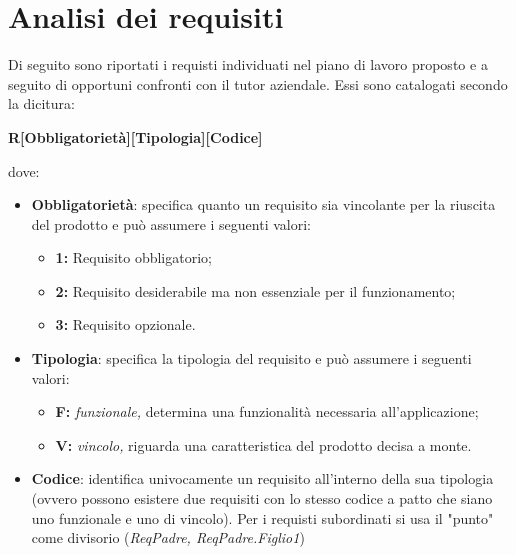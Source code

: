 \section{Analisi dei requisiti}
\label{sec:analisi_requisiti}
Di seguito sono riportati i requisti individuati nel piano di lavoro proposto e a seguito di opportuni confronti con il tutor aziendale. Essi sono catalogati secondo la dicitura:
\begin{center}
    \textbf{R[Obbligatorietà][Tipologia][Codice]}
\end{center}
dove:
\begin{itemize}
    \item \textbf{Obbligatorietà}: specifica quanto un requisito sia vincolante per la riuscita del prodotto e può assumere i seguenti valori:
    \begin{itemize}
        \item \textbf{1: } Requisito obbligatorio;
        \item \textbf{2: } Requisito desiderabile ma non essenziale per il funzionamento;
        \item \textbf{3: } Requisito opzionale.
    \end{itemize}
    \item \textbf{Tipologia}: specifica la tipologia del requisito e può assumere i seguenti valori:
    \begin{itemize}
        \item \textbf{F: }\textit{funzionale,} determina una funzionalità necessaria all'applicazione;
        \item \textbf{V: }\textit{vincolo,} riguarda una caratteristica del prodotto decisa a monte.
    \end{itemize}
    \item \textbf{Codice}: identifica univocamente un requisito all'interno della sua tipologia (ovvero possono esistere due requisiti con lo stesso codice a patto che siano uno funzionale e uno di vincolo). Per i requisti subordinati si usa il "punto" come divisorio (\textit{ReqPadre, ReqPadre.Figlio1})
\end{itemize}

